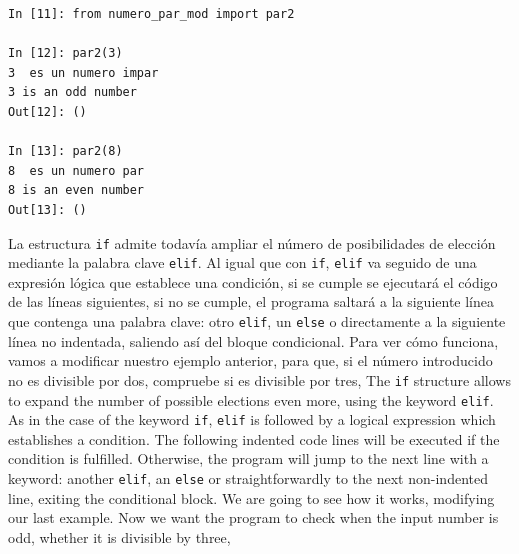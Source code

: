 \begin{center}
    \begin{minipage}{.5\textwidth}
\begin{verbatim}
In [11]: from numero_par_mod import par2

In [12]: par2(3)
3  es un numero impar
3 is an odd number
Out[12]: ()

In [13]: par2(8)
8  es un numero par
8 is an even number
Out[13]: ()
\end{verbatim}
\end{minipage}
\end{center}
    
\begin{paracol}{2}
La estructura \texttt{if} admite todavía ampliar el número de posibilidades de elección mediante la palabra clave \texttt{elif}. Al igual que  con \texttt{if}, \texttt{elif} va seguido de una expresión lógica que establece una condición, si se cumple se ejecutará el código de las líneas siguientes, si no se cumple, el programa saltará a la siguiente línea que contenga una palabra clave: otro \texttt{elif}, un \texttt{else} o directamente a la siguiente línea no indentada, saliendo así del bloque condicional. Para ver cómo funciona, vamos a modificar nuestro ejemplo anterior, para que, si el número introducido no es divisible por dos, compruebe si es divisible por tres,
\switchcolumn
The \texttt{if} structure allows to expand the number of possible elections even more, using the keyword \texttt{elif}. As in the case of the keyword \texttt{if}, \texttt{elif} is followed by a logical expression which establishes a condition. The following indented code lines will be executed if the condition is fulfilled. Otherwise, the program will jump to the next line with a keyword: another \texttt{elif}, an \texttt{else} or straightforwardly to the next non-indented line, exiting the conditional block. We are going to see how it works, modifying our last example. Now we want the program to check when the input number is odd, whether it is divisible by three, 
\end{paracol}

